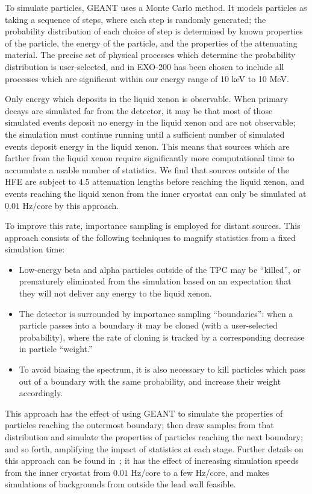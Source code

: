 To simulate particles, GEANT uses a Monte Carlo method.  It models particles as taking a sequence of steps, where each step is randomly generated; the probability distribution of each choice of step is determined by known properties of the particle, the energy of the particle, and the properties of the attenuating material.  The precise set of physical processes which determine the probability distribution is user-selected, and in EXO-200 has been chosen to include all processes which are significant within our energy range of 10 keV to 10 MeV.~\cite{MCDocumentRun2a}

Only energy which deposits in the liquid xenon is observable.  When primary decays are simulated far from the detector, it may be that most of those simulated events deposit no energy in the liquid xenon and are not observable; the simulation must continue running until a sufficient number of simulated events deposit energy in the liquid xenon.  This means that sources which are farther from the liquid xenon require significantly more computational time to accumulate a usable number of statistics.  We find that sources outside of the HFE are subject to $4.5$ attenuation lengths before reaching the liquid xenon, and events reaching the liquid xenon from the inner cryostat can only be simulated at $0.01$ Hz/core by this approach.~\cite{MCDocumentRun2a}

To improve this rate, importance sampling is employed for distant sources.  This approach consists of the following techniques to magnify statistics from a fixed simulation time:
\begin{itemize}
\item Low-energy beta and alpha particles outside of the TPC may be ``killed'', or prematurely eliminated from the simulation based on an expectation that they will not deliver any energy to the liquid xenon.
\item The detector is surrounded by importance sampling ``boundaries'': when a particle passes into a boundary it may be cloned (with a user-selected probability), where the rate of cloning is tracked by a corresponding decrease in particle ``weight.''
\item To avoid biasing the spectrum, it is also necessary to kill particles which pass out of a boundary with the same probability, and increase their weight accordingly.
\end{itemize}
This approach has the effect of using GEANT to simulate the properties of particles reaching the outermost boundary; then draw samples from that distribution and simulate the properties of particles reaching the next boundary; and so forth, amplifying the impact of statistics at each stage.  Further details on this approach can be found in~\cite{Dressel:642987}; it has the effect of increasing simulation speeds from the inner cryostat from $0.01$ Hz/core to a few Hz/core, and makes simulations of backgrounds from outside the lead wall feasible.~\cite{MCDocumentRun2a}

